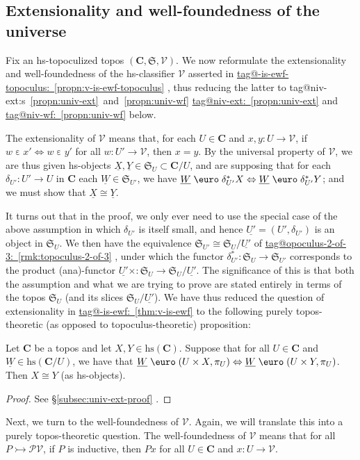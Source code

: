 \documentclass{amsart}
\makeatletter
\newcommand\bC{\mathbf{C}}
\newcommand\cV{\mathcal{V}}
\newcommand\Ein{\mathrel{\text{\textup{\euro}}}}
\newcommand\ein{\mathrel{\varepsilon}}
\newcommand\fS{\mathfrak{S}}
\newcommand\hs{\mathrm{hs}}
\newcommand\pow{\mathcal{P}}
\newcommand\ToT{\Leftrightarrow}
\newcommand\tto{\rightarrowtail}
\newcommand\und[1]{\underline{#1}}
\newcommand\tagword[1]{\csname tag@#1\endcsname}
\def\label@tag#1:#2\@nil{#1}
\newcommand\labeltag[1]{\label@tag#1:\@nil}
\newcommand\jref[1]{%
  \texorpdfstring%
    {\hyperref[#1]{\tagword{\labeltag{#1}}~\ref*{#1}}}%
    {\tagword{\labeltag{#1}}~\ref*{#1}}%
}
\newcommand\jrefs[2]{%
  \ifthenelse{\equal{\labeltag{#1}}{\labeltag{#2}}}%
  {%
    \texorpdfstring%
      {\tagword{\labeltag{#1}}s~\ref{#1}~and~\ref{#2}}%
      {\tagword{\labeltag{#1}}s~\ref*{#1}~and~\ref*{#2}}%
  }{\jref{#1} and \jref{#2}}%
}
\newcommand\prerefpost[3]{%
  \texorpdfstring%
    {\hyperref[#2]{#1\ref*{#2}#3}}%
    {#1\ref*{#2}#3}%
}
\newcommand\sref[1]{\prerefpost{\S}{#1}{}}
\theoremstyle{definition}
\theoremstyle{remark}
\theoremstyle{plainwithref}
\makeatother
\begin{document}
\subsection{Extensionality and well-foundedness of the universe} \label{subsec:univ-ext-wf}
Fix an hs-topoculized topos \( (\bC, \fS, \cV) \).
We now reformulate the extensionality and well-foundedness of the hs-classifier \( \cV \) asserted in \jref{propn:v-is-ewf-topoculus}, thus reducing the latter to \jrefs{propn:univ-ext}{propn:univ-wf} below.

The extensionality of \( \cV \) means that, for each \( U \in \bC \) and \( x,y \colon U \to \cV \), if \( w \ein x' \ToT w \ein y' \) for all \( w \colon U' \to \cV \), then \( x = y \).
By the universal property of \( \cV \), we are thus given hs-objects \( \und X, \und Y \in \fS_U \subset \bC / U \), and are supposing that for each \( \delta_{U'} \colon U' \to U \) in \( \bC \) each \( \und W \in \fS_{U'} \), we have \( \und W \Ein \delta_{U'}^* X \ToT \und W \Ein \delta_{U'}^* Y \); and we must show that \( \und X \cong \und Y \).

It turns out that in the proof, we only ever need to use the special case of the above assumption in which \( \delta_{U'} \) is itself small, and hence \( \und{U'} = (U', \delta_{U'}) \) is an object in \( \fS_{U} \).
We then have the equivalence \( \fS_{U'} \cong \fS_U / \und{U'} \) of \jref{rmk:topoculus-2-of-3}, under which the functor \( \delta_{U'}^* \colon \fS_U \to \fS_{U'} \) corresponds to the product (ana)-functor \( \und{U'} \times \colon \fS_U \to \fS_U / \und{U'} \).
The significance of this is that both the assumption and what we are trying to prove are stated entirely in terms of the topos \( \fS_U \) (and its slices \( \fS_U / \und{U'} \)).
We have thus reduced the question of extensionality in \jref{thm:v-is-ewf} to the following purely topos-theoretic (as opposed to topoculus-theoretic) proposition:
\begin{propn} \label{propn:univ-ext}
  Let \( \bC \) be a topos and let \( X, Y \in \hs(\bC) \).
  Suppose that for all \( U \in \bC \) and \( \und W \in \hs(\bC / U) \), we have that \( \und W \Ein (U \times X, \pi_U) \ToT \und W \Ein (U \times Y, \pi_U) \).
  Then \( X \cong Y \) (as hs-objects).
\end{propn}

\begin{proof}
  See \sref{subsec:univ-ext-proof}.
\end{proof}

Next, we turn to the well-foundedness of \( \cV \).
Again, we will translate this into a purely topos-theoretic question.
The well-foundedness of \( \cV \) means that for all \( P \tto \pow \cV \), if \( P \) is inductive, then \( P x \) for all \( U \in \bC \) and \( x \colon U \to \cV \).
\end{document}
